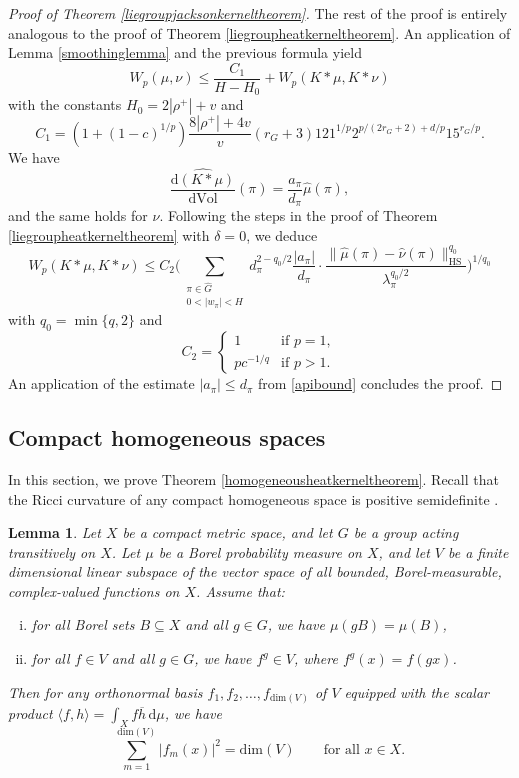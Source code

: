\documentclass[11pt,a4paper]{article}
\newtheorem{lem}[thm]{Lemma}
\theoremstyle{definition}
\begin{document}
\begin{proof}[Proof of Theorem \ref{liegroupjacksonkerneltheorem}]
The rest of the proof is entirely analogous to the proof of Theorem \ref{liegroupheatkerneltheorem}. An application of Lemma \ref{smoothinglemma} and the previous formula yield
\[ W_p (\mu, \nu) \le \frac{C_1}{H-H_0} + W_p (K*\mu, K*\nu) \]
with the constants $H_0=2|\rho^+|+v$ and
\[ C_1 = (1+(1-c)^{1/p}) \frac{8 |\rho^+|+4v}{v} (r_G+3) 121^{1/p} 2^{p/(2r_G+2)+d/p} 15^{r_G /p} . \]
We have
\[ \widehat{\frac{\mathrm{d}(K*\mu)}{\mathrm{d}\mathrm{Vol}}}(\pi) = \frac{a_{\pi}}{d_{\pi}} \widehat{\mu}(\pi) , \]
and the same holds for $\nu$. Following the steps in the proof of Theorem \ref{liegroupheatkerneltheorem} with $\delta =0$, we deduce
\[ W_p (K*\mu, K*\nu) \le C_2 \Bigg( \sum_{\substack{\pi \in \widehat{G} \\ 0< |w_{\pi}|<H}} d_{\pi}^{2-q_0/2} \frac{|a_{\pi}|}{d_{\pi}} \cdot \frac{\| \widehat{\mu}(\pi) - \widehat{\nu}(\pi) \|_{\mathrm{HS}}^{q_0}}{\lambda_{\pi}^{q_0/2}} \Bigg)^{1/q_0} \]
with $q_0=\min \{ q, 2 \}$ and
\[ C_2 = \left\{ \begin{array}{ll} 1 & \textrm{if } p=1, \\ p c^{-1/q} & \textrm{if } p>1 . \end{array} \right. \]
An application of the estimate $|a_{\pi}| \le d_{\pi}$ from \eqref{apibound} concludes the proof.
\end{proof}

\subsection{Compact homogeneous spaces}

In this section, we prove Theorem \ref{homogeneousheatkerneltheorem}. Recall that the Ricci curvature of any compact homogeneous space is positive semidefinite \cite{SA}.
\begin{lem}\label{groupactionlemma} Let $X$ be a compact metric space, and let $G$ be a group acting transitively on $X$. Let $\mu$ be a Borel probability measure on $X$, and let $V$ be a finite dimensional linear subspace of the vector space of all bounded, Borel-measurable, complex-valued functions on $X$. Assume that:
\begin{enumerate}[(i)]
\item for all Borel sets $B \subseteq X$ and all $g \in G$, we have $\mu(gB)=\mu(B)$,

\item for all $f \in V$ and all $g \in G$, we have $f^g \in V$, where $f^g(x)=f(gx)$.
\end{enumerate}
Then for any orthonormal basis $f_1, f_2, \ldots, f_{\mathrm{dim}(V)}$ of $V$ equipped with the scalar product $\langle f,h \rangle = \int_X f \overline{h} \, \mathrm{d}\mu$, we have
\[ \sum_{m=1}^{\mathrm{dim}(V)} |f_m (x)|^2 = \mathrm{dim}(V) \qquad \textrm{for all } x \in X. \]
\end{lem}
\end{document}
